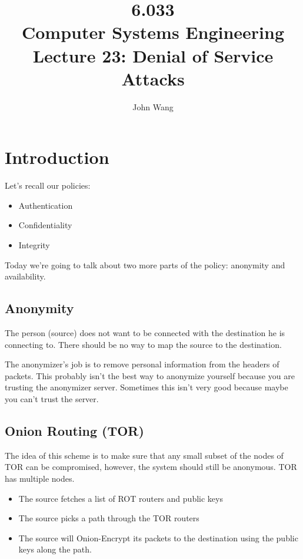 \documentclass[psamsfonts]{amsart}
\title{6.033 \\
Computer Systems Engineering \\
Lecture 23: Denial of Service Attacks}
\author{John Wang}
\begin{document}
\maketitle

\section{Introduction}

Let's recall our policies:

\begin{itemize}
  \item Authentication
  \item Confidentiality
  \item Integrity
\end{itemize}

Today we're going to talk about two more parts of the policy: anonymity and availability.

\subsection{Anonymity}

The person (source) does not want to be connected with the destination he is connecting to. There should be no way to map the source to the destination.

The anonymizer's job is to remove personal information from the headers of packets. This probably isn't the best way to anonymize yourself because you are trusting the anonymizer server. Sometimes this isn't very good because maybe you can't trust the server.

\subsection{Onion Routing (TOR)}

The idea of this scheme is to make sure that any small subset of the nodes of TOR can be compromised, however, the system should still be anonymous. TOR has multiple nodes.

\begin{itemize}
  \item The source fetches a list of ROT routers and public keys
  \item The source picks a path through the TOR routers
  \item The source will Onion-Encrypt its packets to the destination using the public keys along the path.
\end{itemize}
\end{document}
